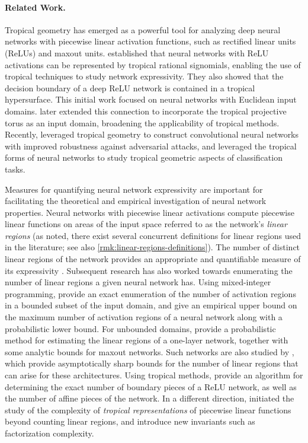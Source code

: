 \documentclass[10pt]{article}
\theoremstyle{definition}
\theoremstyle{remark}
\begin{document}
\paragraph{Related Work.} 
Tropical geometry has emerged as a powerful tool for analyzing deep neural networks with piecewise linear activation functions, such as rectified linear units (ReLUs) and maxout units. 
\cite{zhang2018tropical} established that neural networks with ReLU activations can be represented by tropical rational signomials, enabling the use of tropical techniques to study network expressivity. 
They also showed that the decision boundary of a deep ReLU network is contained in a tropical hypersurface. 
This initial work focused on neural networks with Euclidean input domains. \cite{yoshida2024tropical} later extended this connection to incorporate the tropical projective torus as an input domain, broadening the applicability of tropical methods.
Recently, \cite{pasque2026adversarially} leveraged tropical geometry to construct convolutional neural networks with improved robustness against adversarial attacks, and \cite{brandenburg2024realtropicalgeometryneural} leveraged the tropical forms of neural networks to study tropical geometric aspects of classification tasks.

Measures for quantifying neural network expressivity are important for facilitating the theoretical and empirical investigation of neural network properties. Neural networks with piecewise linear activations compute piecewise linear functions on areas of the input space referred to as the network's \emph{linear regions} (as \cite{stargalla2025computational} noted, there exist several concurrent definitions for linear regions used in the literature; see also \cref{rmk:linear-regions-definitions}). The number of distinct linear regions of the network provides an appropriate and quantifiable measure of its expressivity \citep[e.g.,][]{montufar2014number}.
Subsequent research has also worked towards enumerating the number of linear regions a given neural network has. 
Using mixed-integer programming, \cite{serra2018bounding} provide an exact enumeration of the number of activation regions in a bounded subset of the input domain, and
\cite{serra2020empirical} give an empirical upper bound on the maximum number of activation regions of a neural network along with a probabilistic lower bound.
For unbounded domains, \cite{charisopoulos2018tropical} provide a probabilistic method for estimating the linear regions of a one-layer network, together with some analytic bounds for maxout networks. Such networks are also studied by \cite{montufar2022sharp}, which provide asymptotically sharp bounds for the number of linear regions that can arise for these architectures.
Using tropical methods, \cite{piwek2023exact} provide an algorithm for determining the exact number of boundary pieces of a ReLU network, as well as the number of affine pieces of the network. 
In a different direction, \cite{tran2024minimal} initiated the study of the complexity of \emph{tropical representations} of piecewise linear functions beyond counting linear regions, and introduce new invariants such as factorization complexity.
\end{document}
